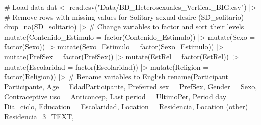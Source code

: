 \documentclass[
  bookmarksnumbered]{article}
\newenvironment{Shaded}{\begin{snugshade}}{\end{snugshade}}
\newcommand{\AttributeTok}[1]{\textcolor[rgb]{0.80,0.80,0.80}{#1}}
\newcommand{\CommentTok}[1]{\textcolor[rgb]{0.50,0.62,0.50}{#1}}
\newcommand{\FunctionTok}[1]{\textcolor[rgb]{0.94,0.94,0.56}{#1}}
\newcommand{\NormalTok}[1]{\textcolor[rgb]{0.80,0.80,0.80}{#1}}
\newcommand{\OtherTok}[1]{\textcolor[rgb]{0.94,0.94,0.56}{#1}}
\newcommand{\SpecialCharTok}[1]{\textcolor[rgb]{0.86,0.64,0.64}{#1}}
\newcommand{\StringTok}[1]{\textcolor[rgb]{0.80,0.58,0.58}{#1}}
\begin{document}
\begin{Shaded}
\begin{Highlighting}[]
\CommentTok{\# Load data}
\NormalTok{dat }\OtherTok{\textless{}{-}} \FunctionTok{read.csv}\NormalTok{(}\StringTok{"Data/BD\_Heterosexuales\_Vertical\_BIG.csv"}\NormalTok{) }\SpecialCharTok{|\textgreater{}}
  \CommentTok{\# Remove rows with missing values for Solitary sexual desire (SD\_solitario)}
  \FunctionTok{drop\_na}\NormalTok{(SD\_solitario) }\SpecialCharTok{|\textgreater{}} 
  \CommentTok{\# Change variables to factor and sort their levels}
  \FunctionTok{mutate}\NormalTok{(}\AttributeTok{Contenido\_Estimulo =} \FunctionTok{factor}\NormalTok{(Contenido\_Estimulo)) }\SpecialCharTok{|\textgreater{}} 
  \FunctionTok{mutate}\NormalTok{(}\AttributeTok{Sexo =} \FunctionTok{factor}\NormalTok{(Sexo)) }\SpecialCharTok{|\textgreater{}}
  \FunctionTok{mutate}\NormalTok{(}\AttributeTok{Sexo\_Estimulo =} \FunctionTok{factor}\NormalTok{(Sexo\_Estimulo)) }\SpecialCharTok{|\textgreater{}}
  \FunctionTok{mutate}\NormalTok{(}\AttributeTok{PrefSex =} \FunctionTok{factor}\NormalTok{(PrefSex)) }\SpecialCharTok{|\textgreater{}}
  \FunctionTok{mutate}\NormalTok{(}\AttributeTok{EstRel =} \FunctionTok{factor}\NormalTok{(EstRel)) }\SpecialCharTok{|\textgreater{}}
  \FunctionTok{mutate}\NormalTok{(}\AttributeTok{Escolaridad =} \FunctionTok{factor}\NormalTok{(Escolaridad)) }\SpecialCharTok{|\textgreater{}}
  \FunctionTok{mutate}\NormalTok{(}\AttributeTok{Religion =} \FunctionTok{factor}\NormalTok{(Religion)) }\SpecialCharTok{|\textgreater{}}
  \CommentTok{\# Rename variables to English}
  \FunctionTok{rename}\NormalTok{(}\AttributeTok{Participant =}\NormalTok{ Participante,}
         \AttributeTok{Age =}\NormalTok{ EdadParticipante,}
         \StringTok{\textasciigrave{}}\AttributeTok{Preferred sex}\StringTok{\textasciigrave{}}  \OtherTok{=}\NormalTok{ PrefSex,}
         \AttributeTok{Gender =}\NormalTok{ Sexo,}
         \StringTok{\textasciigrave{}}\AttributeTok{Contraceptive uso}\StringTok{\textasciigrave{}} \OtherTok{=}\NormalTok{ Anticoncep,}
         \StringTok{\textasciigrave{}}\AttributeTok{Last period}\StringTok{\textasciigrave{}} \OtherTok{=}\NormalTok{ UltimoPer,}
         \StringTok{\textasciigrave{}}\AttributeTok{Period day}\StringTok{\textasciigrave{}} \OtherTok{=}\NormalTok{ Dia\_ciclo,}
         \AttributeTok{Education =}\NormalTok{ Escolaridad,}
         \AttributeTok{Location =}\NormalTok{ Residencia,}
         \StringTok{\textasciigrave{}}\AttributeTok{Location (other)}\StringTok{\textasciigrave{}} \OtherTok{=}\NormalTok{ Residencia\_3\_TEXT,}

\end{Highlighting}
\end{Shaded}
\end{document}
